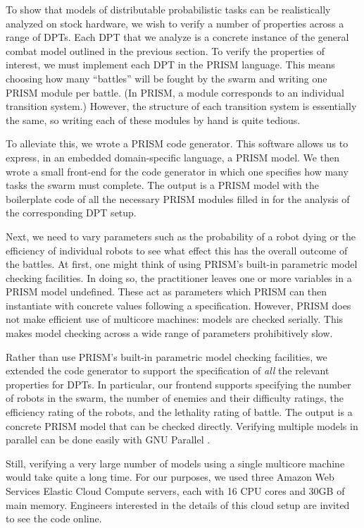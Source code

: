 \documentclass[11pt]{article}
\theoremstyle{definition}
\begin{document}
To show that models of distributable probabilistic tasks can be realistically
analyzed on stock hardware, we wish to verify a number of properties across a
range of DPTs.
Each DPT that we analyze is a concrete instance of the general combat model
outlined in the previous section.
To verify the properties of interest, we must implement each DPT in the PRISM
language.
This means choosing how many ``battles'' will be fought by the swarm and
writing one PRISM module per battle.
(In PRISM, a module corresponds to an individual transition system.)
However, the structure of each transition system is essentially the same, so
writing each of these modules by hand is quite tedious.

To alleviate this, we wrote a PRISM code generator.
This software allows us to express, in an embedded domain-specific language, a
PRISM model.
We then wrote a small front-end for the code generator in which one specifies
how many tasks the swarm must complete.
The output is a PRISM model with the boilerplate code of all the necessary
PRISM modules filled in for the analysis of the corresponding DPT setup.

Next, we need to vary parameters such as the probability of a robot dying or
the efficiency of individual robots to see what effect this has the overall
outcome of the battles.
%
At first, one might think of using PRISM's built-in parametric model checking
facilities.
%
In doing so, the practitioner leaves one or more variables in a PRISM model
undefined.
%
These act as parameters which PRISM can then instantiate with concrete values
following a specification.
%
However, PRISM does not make efficient use of multicore machines:
models are checked serially.
This makes model checking across a wide range of parameters prohibitively slow.

Rather than use PRISM's built-in parametric model checking facilities, we
extended the code generator to support the specification of \emph{all} the
relevant properties for DPTs.
%
In particular, our frontend supports specifying the number of robots in the
swarm, the number of enemies and their difficulty ratings, the efficiency
rating of the robots, and the lethality rating of battle.
%
The output is a concrete PRISM model that can be checked directly.
%
Verifying multiple models in parallel can be done easily with GNU Parallel
\cite{parallel}.

Still, verifying a very large number of models using a single multicore machine
would take quite a long time.
For our purposes, we used three Amazon Web Services Elastic Cloud Compute
servers, each with 16 CPU cores and 30GB of main memory.
Engineers interested in the details of this cloud setup are invited to see the
code online\footnotemark.
\end{document}
